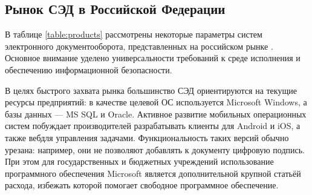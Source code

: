 \subsection{Рынок СЭД в Российской Федерации} \label{review_products}

В таблице \ref{table:products} рассмотрены некоторые параметры систем электронного документооборота, представленных на российском рынке \cite{ixbt, evfrat}. Основное внимание уделено универсальности требований к среде исполнения и обеспечению информационной безопасности.

\vspace{\baselineskip}
В целях быстрого захвата рынка большинство СЭД ориентируются на текущие ресурсы предприятий: в качестве целевой ОС используется Microsoft Windows, а базы данных --- MS SQL и Oracle. Активное развитие мобильных операционных систем побуждает производителей разрабатывать клиенты для Android и iOS, а также веб для управления задачами. Функциональность таких версий обычно урезана: например, они не позволяют добавлять к документу цифровую подпись. При этом для государственных и бюджетных учреждений использование программного обеспечения Microsoft является дополнительной крупной статьёй расхода, избежать которой помогает свободное программное обеспечение.

